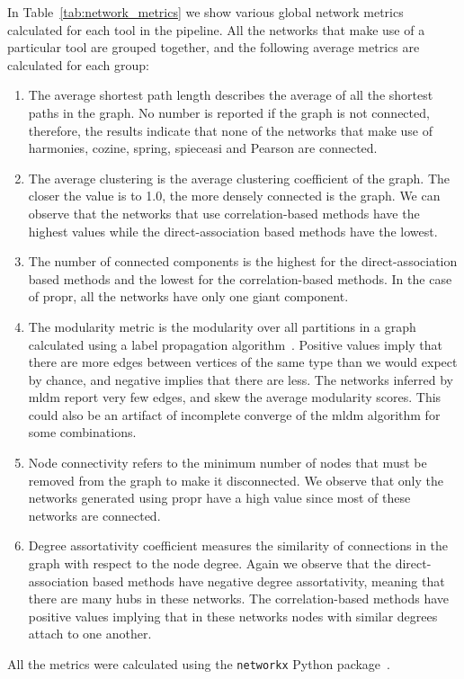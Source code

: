   In Table~\ref{tab:network_metrics} we show various global network metrics calculated for each tool in the pipeline.
  All the networks that make use of a particular tool are grouped together, and the following average metrics are calculated for each group:
  \begin{enumerate}
    \item The average shortest path length describes the average of all the shortest paths in the graph. No number is reported if the graph is not connected, therefore, the results indicate that none of the networks that make use of \ac{harmonies}, \ac{cozine}, \ac{spring}, \ac{spieceasi} and Pearson are connected.
    \item The average clustering is the average clustering coefficient of the graph. The closer the value is to 1.0, the more densely connected is the graph. We can observe that the networks that use correlation-based methods have the highest values while the direct-association based methods have the lowest.
    \item The number of connected components is the highest for the direct-association based methods and the lowest for the correlation-based methods. In the case of propr, all the networks have only one giant component.
    \item The modularity metric is the modularity over all partitions in a graph calculated using a label propagation algorithm~\cite{cordascoCommunityDetectionSemisynchronous2010}. Positive values imply that there are more edges between vertices of the same type than we would expect by chance, and negative implies that there are less. The networks inferred by \ac{mldm} report very few edges, and skew the average modularity scores. This could also be an artifact of incomplete converge of the \ac{mldm} algorithm for some combinations.
    \item Node connectivity refers to the minimum number of nodes that must be removed from the graph to make it disconnected. We observe that only the networks generated using propr have a high value since most of these networks are connected.
    \item Degree assortativity coefficient measures the similarity of connections in the graph with respect to the node degree. Again we observe that the direct-association based methods have negative degree assortativity, meaning that there are many hubs in these networks. The correlation-based methods have positive values implying that in these networks nodes with similar degrees attach to one another.
  \end{enumerate}
  All the metrics were calculated using the \texttt{networkx} Python package~\cite{hagbergExploringNetworkStructure2008}.

